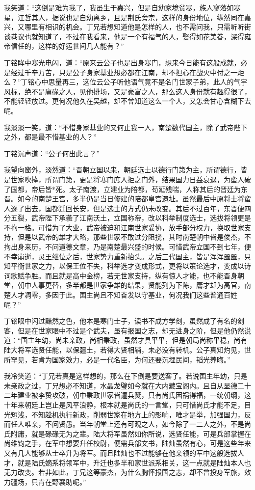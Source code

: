 我笑道：“这倒是难为我了，我虽生于嘉兴，但是自幼家境贫寒，族人寥落如寒星，江哲其人，据说也是自幼离乡，且是荆氏旁宗，这样的身份地位，纵然同在嘉兴，又哪里有相识的机会。丁兄若想知道他是怎样的人，也不需问我，只需听听街谈巷议也就知道了，不过在我看来，他是一个有福气的人，娶得如花美眷，深得雍帝信任的，这样的好运世间几人能有？”

丁铭眸中寒光电闪，道：“原来云公子也是出身寒门，想来今日能有这般成就，必是经过千辛万苦，只是公子身家基业想必都在江南，却不担心在战火中付之一炬么？”丁铭心中思量再三，这位云公子听他语气竟不是名门世家子弟，此人的气宇风标，绝不是庸碌之人，见他排场，又是豪富之人，那么这人身份就有趣得很了，不能轻轻放过。更何况他久在吴越，却不曾知道这么一个人，又怎会甘心含糊下去呢。

我淡淡一笑，道：“不惜身家基业的又何止我一人，南楚数代国主，除了武帝陛下之外，都是最不惜基业的人？”

丁铭沉声道：“公子何出此言？”

我望向窗外，淡然道：“晋朝立国以来，朝廷选士以德行门第为主，所谓德行，皆是世家吹捧，所谓门第，更是将寒门庶人拒之门外，结果国力日益衰退，为蛮人破了国都，帝后皆*死。太子南渡，立建业为陪都，苟延残喘，人称其后的晋廷为东晋。如今的南楚王宫，多半仍是当日修建的陪都皇宫遗址。虽然最后中原将士将蛮人逐了出去，国都迁回长安，但是选士的方式仍未改变。其后不过百年，东晋便四分五裂，武帝陛下承袭了江南沃土，立国称帝，改以科举制度选士，选拔将领更是不拘一格。可惜为了大业，武帝被迫和江南世家妥协，放手部分权力，换取世家支持，但是以武帝的雄才大略，那些世家不敢过分阻挠，其时南楚朝中皆是俊杰，不拘出身来历，不问道德文章，乃是南楚最兴盛的时候。可惜武帝立国不到七年，便不幸崩逝，灵王继位之后，世家势力重新抬头。之后三代国主，皆是浑浑噩噩，只知平衡世家之力，以保王位不失，科举选才变成形式，更将以策论选才，变成以诗词歌赋争胜。而且就是高中金榜，若无世家支持，纵有惊人才能，也不能晋身朝堂，朝中人事更替，多半都是世家争雄的结果，贤能列为下陈，庸才却为高官，南楚人才凋零，多因于此。国主尚且不知奋发以守基业，何况我们这些普通百姓呢？”

丁铭眼中闪过黯然之色，他本是寒门士子，读书不成方学剑，虽然成了有名的剑客，但是在世家眼中不过是个武夫，虽有报国之志，却无进身之阶，但是他仍然说道：“国主年幼，尚未亲政，尚相秉政，虽然才具平平，但是朝局尚称平稳，尚有陆大将军选贤任能，以保疆土，若得大贤相辅，未必没有转机。公子真知灼见，世所罕见，若肯为国家效力，必是一代名臣，为何还要沉埋民间，韬光养晦。”

我冷笑道：“丁兄若真是这样想的，那么在下倒是要送客了。若说国主年幼，只是未亲政之过，丁兄想必不知道，水晶龙璧如今就在大内藏宝阁内。且自从显德二十二年建业被李贽攻破，朝中秉政世家皆遭兵燹，只有尚氏因祸得福，一统朝纲，这十年来朝廷上岂止是风平浪静，根本就是尚氏的一言堂，只可惜尚氏才能不足，目光短浅，不知趁机执行新政，削弱世家在地方上的影响，唯才是举，加强国力，反而任人唯亲，不问贤愚。当年朝堂上还有可观之人，如今除了一二人之外，不是尚氏附庸，就是碌碌无为之辈。陆大将军虽然如你所说，选贤任能，可是兵部掌握在尚维钧之手，在军中想要升任校尉，便需兵部文书，陆灿虽然有心，可是这些年来又有几人能够从士卒升为将军。而且陆灿也不过能够在他亲领的军中这般选拔人才，就是陆氏嫡系将领军中，升迁也多半和家世派系相关，这一点就是陆灿本人也无力改变。若非如此，丁兄这等豪杰，为什么胸怀报国之志，却不曾投身军旅，效力疆场，只肯在野襄助呢。”

